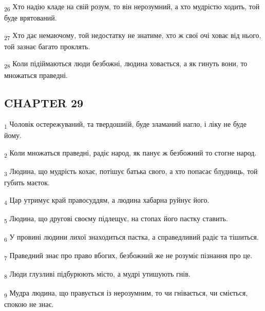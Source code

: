 \begin{tcolorbox}
\textsubscript{26} Хто надію кладе на свій розум, то він нерозумний, а хто мудрістю ходить, той буде врятований.
\end{tcolorbox}
\begin{tcolorbox}
\textsubscript{27} Хто дає немаючому, той недостатку не знатиме, хто ж свої очі ховає від нього, той зазнає багато проклять.
\end{tcolorbox}
\begin{tcolorbox}
\textsubscript{28} Коли підіймаються люди безбожні, людина ховається, а як гинуть вони, то множаться праведні.
\end{tcolorbox}
\subsection{CHAPTER 29}
\begin{tcolorbox}
\textsubscript{1} Чоловік остережуваний, та твердошиїй, буде зламаний нагло, і ліку не буде йому.
\end{tcolorbox}
\begin{tcolorbox}
\textsubscript{2} Коли множаться праведні, радіє народ, як панує ж безбожний то стогне народ.
\end{tcolorbox}
\begin{tcolorbox}
\textsubscript{3} Людина, що мудрість кохає, потішує батька свого, а хто попасає блудниць, той губить маєток.
\end{tcolorbox}
\begin{tcolorbox}
\textsubscript{4} Цар утримує край правосуддям, а людина хабарна руйнує його.
\end{tcolorbox}
\begin{tcolorbox}
\textsubscript{5} Людина, що другові своєму підлещує, на стопах його пастку ставить.
\end{tcolorbox}
\begin{tcolorbox}
\textsubscript{6} У провині людини лихої знаходиться пастка, а справедливий радіє та тішиться.
\end{tcolorbox}
\begin{tcolorbox}
\textsubscript{7} Праведний знає про право вбогих, безбожний же не розуміє пізнання про це.
\end{tcolorbox}
\begin{tcolorbox}
\textsubscript{8} Люди глузливі підбурюють місто, а мудрі утишують гнів.
\end{tcolorbox}
\begin{tcolorbox}
\textsubscript{9} Мудра людина, що правується із нерозумним, то чи гнівається, чи сміється, спокою не знає.
\end{tcolorbox}
